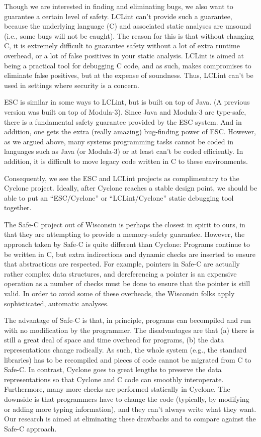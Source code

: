 Though we are interested in finding and eliminating bugs, we also want
to guarantee a certain level of safety. LCLint can't provide such a
guarantee, because the underlying language (C) and associated static
analyses are unsound (i.e., some bugs will not be caught). The reason
for this is that without changing C, it is extremely difficult to
guarantee safety without a lot of extra runtime overhead, or a lot of
false positives in your static analysis. LCLint is aimed at being a
practical tool for debugging C code, and as such, makes compromises to
eliminate false positives, but at the expense of soundness. Thus,
LCLint can't be used in settings where security is a concern.

ESC is similar in some ways to LCLint, but is built on top of Java. (A
previous version was built on top of Modula-3). Since Java and
Modula-3 are type-safe, there is a fundamental safety guarantee
provided by the ESC system. And in addition, one gets the extra
(really amazing) bug-finding power of ESC\@. However, as we argued
above, many systems programming tasks cannot be coded in languages
such as Java (or Modula-3) or at least can't be coded efficiently. In
addition, it is difficult to move legacy code written in C to these
environments.

Consequently, we see the ESC and LCLint projects as complimentary to
the Cyclone project. Ideally, after Cyclone reaches a stable design
point, we should be able to put an ``ESC/Cyclone'' or
``LCLint/Cyclone'' static debugging tool together.

The Safe-C project out of Wisconsin is perhaps the closest in spirit
to ours, in that they are attempting to provide a memory-safety
guarantee. However, the approach taken by Safe-C is quite different
than Cyclone: Programs continue to be written in C, but extra
indirections and dynamic checks are inserted to ensure that
abstractions are respected. For example, pointers in Safe-C are
actually rather complex data structures, and dereferencing a pointer
is an expensive operation as a number of checks must be done to ensure
that the pointer is still valid. In order to avoid some of these
overheads, the Wisconsin folks apply sophisticated, automatic
analyses.

The advantage of Safe-C is that, in principle, programs can becompiled
and run with no modification by the programmer. The disadvantages are
that (a) there is still a great deal of space and time overhead for
programs, (b) the data representations change radically. As such, the
whole system (e.g., the standard libraries) has to be recompiled and
pieces of code cannot be migrated from C to Safe-C\@. In contrast,
Cyclone goes to great lengths to preserve the data representations so
that Cyclone and C code can smoothly interoperate. Furthermore, many
more checks are performed statically in Cyclone. The downside is that
programmers have to change the code (typically, by modifying or adding
more typing information), and they can't always write what they want.
Our research is aimed at eliminating these drawbacks and to compare
against the Safe-C approach.

